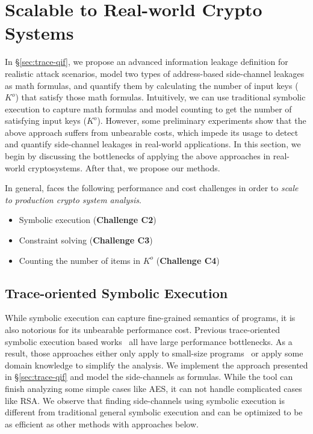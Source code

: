 \section{Scalable to Real-world Crypto Systems}
\label{sec:scala}

In \S\ref{sec:trace-qif}, we propose an advanced information leakage definition for
realistic attack scenarios, model two types of address-based side-channel
leakages as math formulas, and quantify them by calculating the number of input
keys ($K^o$) that satisfy those math formulas. Intuitively, we can use
traditional symbolic execution to capture math formulas and model counting
to get the number of satisfying input keys ($K^o$). However, some preliminary
experiments show that the above approach suffers from unbearable costs, which
impede its usage to detect and quantify side-channel leakages in real-world
applications. In this section, we begin by discussing the bottlenecks of
applying the above approaches in real-world cryptosystems. After that, we
propose our methods.

In general, \tool{} faces the following performance and cost  challenges in
order to \emph{scale to production crypto system analysis}.
\begin{itemize}
      \item Symbolic execution (\textbf{Challenge C2})
      \item Constraint solving (\textbf{Challenge C3})
      \item Counting the number of items in $K^o$ (\textbf{Challenge C4})
\end{itemize}

\subsection{Trace-oriented Symbolic Execution}
While symbolic execution can capture fine-grained semantics of programs, it
is also notorious for its unbearable performance cost. Previous trace-oriented
symbolic execution based
works~\cite{203878,Chattopadhyay:2017:QIL:3127041.3127044} all have large
performance bottlenecks. As a result, those approaches either only apply to
small-size programs~\cite{Chattopadhyay:2017:QIL:3127041.3127044} or apply some
domain knowledge to simplify the analysis. 
We implement
the approach presented in \S\ref{sec:trace-qif} and model the side-channels as
formulas. While the tool can finish analyzing some simple cases like AES, it can
not handle complicated cases like RSA.
We observe that finding side-channels using symbolic execution is different from
traditional general symbolic execution and can be optimized to be as efficient
as other methods with approaches below.

